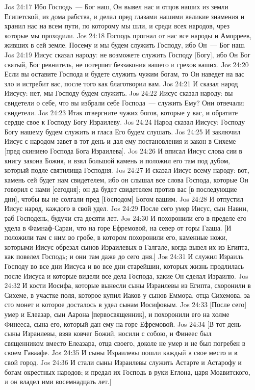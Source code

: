 \vs Jos 24:17 Ибо Господь~--- Бог наш, Он вывел нас и отцов наших из земли Египетской, из дома рабства, и делал пред глазами нашими великие знамения и хранил нас на всем пути, по которому мы шли, и среди всех народов, чрез которые мы проходили.
\vs Jos 24:18 Господь прогнал от нас все народы и Аморреев, живших в сей земле. Посему и мы будем служить Господу, ибо Он~--- Бог наш.
\vs Jos 24:19 Иисус сказал народу: не возможете служить Господу [Богу], ибо Он Бог святый, Бог ревнитель, не потерпит беззакония вашего и грехов ваших.
\vs Jos 24:20 Если вы оставите Господа и будете служить чужим богам, то Он наведет на вас зло и истребит вас, после того как благотворил вам.
\vs Jos 24:21 И сказал народ Иисусу: нет, мы Господу будем служить.
\vs Jos 24:22 Иисус сказал народу: вы свидетели о себе, что вы избрали себе Господа~--- служить Ему? Они отвечали: свидетели.
\vs Jos 24:23 Итак отвергните чужих богов, которые у вас, и обратите сердце свое к Господу Богу Израилеву.
\vs Jos 24:24 Народ сказал Иисусу: Господу Богу нашему будем служить и гласа Его будем слушать.
\vs Jos 24:25 И заключил Иисус с народом завет в тот день и дал ему постановления и закон в Сихеме [пред скиниею Господа Бога Израилева].
\vs Jos 24:26 И вписал Иисус слова сии в книгу закона Божия, и взял большой камень и положил его там под дубом, который подле святилища Господня.
\vs Jos 24:27 И сказал Иисус всему народу: вот, камень сей будет нам свидетелем, ибо он слышал все слова Господа, которые Он говорил с нами [сегодня]; он да будет свидетелем против вас [в последующие дни], чтобы вы не солгали пред [Господом] Богом вашим.
\vs Jos 24:28 И отпустил Иисус народ, каждого в свой удел.
\rsbpar\vs Jos 24:29 После сего умер Иисус, сын Навин, раб Господень, будучи ста десяти лет.
\vs Jos 24:30 И похоронили его в пределе его удела в Фамнаф-Сараи, что на горе Ефремовой, на север от горы Гааша. [И положили там с ним во гробе, в котором похоронили его, каменные ножи, которыми Иисус обрезал сынов Израилевых в Галгале, когда вывел их из Египта, как повелел Господь; и они там даже до сего дня.]
\vs Jos 24:31 И служил Израиль Господу во все дни Иисуса и во все дни старейшин, которых жизнь продлилась после Иисуса и которые видели все дела Господа, какие Он сделал Израилю.
\vs Jos 24:32 И кости Иосифа, которые вынесли сыны Израилевы из Египта, схоронили в Сихеме, в участке поля, которое купил Иаков у сынов Еммора, отца Сихемова, за сто монет и которое досталось в удел сынам Иосифовым.
\vs Jos 24:33 [После сего] умер и Елеазар, сын Аарона [первосвященник], и похоронили его на холме Финееса, сына его, который дан ему на горе Ефремовой.
\vs Jos 24:34 [В тот день сыны Израилевы, взяв ковчег Божий, носили с собою, и Финеес был священником вместо Елеазара, отца своего, доколе не умер и не был погребен в  своем Гаваафе.
\vs Jos 24:35 И сыны Израилевы пошли каждый в свое место и в свой город.
\vs Jos 24:36 И стали сыны Израилевы служить Астарте и Астарофу и богам окрестных народов; и предал их Господь в руки Еглона, царя Моавитского, и он владел ими восемнадцать лет.]

